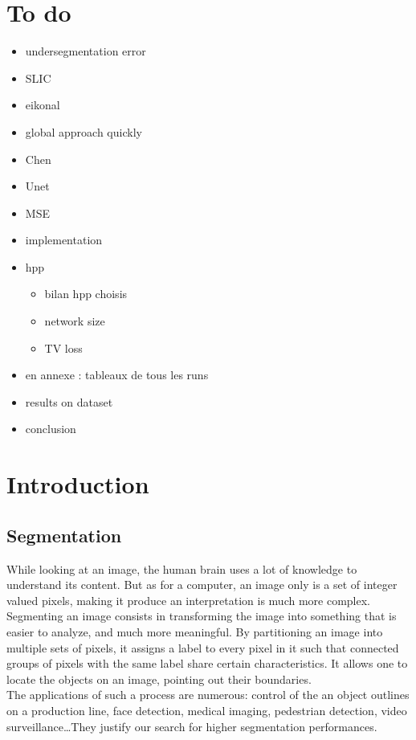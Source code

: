 \documentclass{article}
\begin{document}
\section*{To do}
\begin{itemize}
    \item undersegmentation error
    \item SLIC
    \item eikonal
    \item global approach quickly
    \item Chen
    \item Unet
    \item MSE
    \item implementation
    \item hpp
    \begin{itemize}
        \item bilan hpp choisis
        \item network size
        \item TV loss
    \end{itemize}
    \item en annexe : tableaux de tous les runs
    \item results on dataset
    \item conclusion
\end{itemize}

\section{Introduction}

    \subsection{Segmentation}
        While looking at an image, the human brain uses a lot of knowledge to understand its content. But as for a computer, an image only is a set of integer valued pixels, making it produce an interpretation is much more complex. Segmenting an image consists in transforming the image into something that is easier to analyze, and much more meaningful. By partitioning an image into multiple sets of pixels, it assigns a label to every pixel in it such that connected groups of pixels with the same label share certain characteristics. It allows one to locate the objects on an image, pointing out their boundaries.\\
        The applications of such a process are numerous: control of the an object outlines on a production line, face detection, medical imaging, pedestrian detection, video surveillance\ldots They justify our search for higher segmentation performances.
\end{document}
